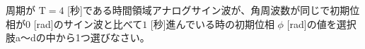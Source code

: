 周期が $\textrm{T}=4$ [秒]である時間領域アナログサイン波が、角周波数が同じで初期位相が$0$ [rad]のサイン波と比べて$1$ [秒]進んでいる時の初期位相 $\phi$ [rad]の値を選択肢a〜dの中から1つ選びなさい。
